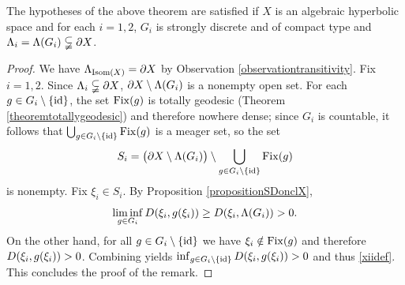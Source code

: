 \begin{remark}
\label{remarkschottkyproduct}
The hypotheses of the above theorem are satisfied if $X$ is an algebraic hyperbolic space and for each $i = 1,2$, $G_i$ is strongly discrete and of compact type and $\Lambda_i = \Lambda(G_i) \subsetneqq\partial X$.
\end{remark}
\begin{proof}
We have $\Lambda_{\operatorname{Isom}(X)} = \partial X$ by Observation \ref{observationtransitivity}. Fix $i = 1,2$. Since $\Lambda_i \subsetneqq\partial X$, $\partial X\setminus\Lambda(G_i)$ is a nonempty open set. For each $g\in G_i\setminus\{\mathrm{id}\}$, the set $\operatorname{Fix}(g)$ is totally geodesic (Theorem \ref{theoremtotallygeodesic}) and therefore nowhere dense; since $G_i$ is countable, it follows that $\bigcup_{g\in G_i\setminus\{\mathrm{id}\}} \operatorname{Fix}(g)$ is a meager set, so the set
\[
S_i = \big(\partial X\setminus\Lambda(G_i)\big)\setminus\bigcup_{g\in G_i\setminus\{\mathrm{id}\}} \operatorname{Fix}(g)
\]
is nonempty. Fix $\xi_i\in S_i$. By Proposition \ref{propositionSDonclX}, 
\[
\liminf_{g\in G_i} D(\xi_i,g(\xi_i)) \geq D(\xi_i,\Lambda(G_i)) > 0. 
\]
On the other hand, for all $g\in G_i\setminus\{\mathrm{id}\}$ we have $\xi_i \notin \operatorname{Fix}(g)$ and therefore $D(\xi_i,g(\xi_i)) > 0$. Combining yields $\inf_{g\in G_i\setminus\{\mathrm{id}\}} D(\xi_i,g(\xi_i)) > 0$ and thus \eqref{xiidef}. This concludes the proof of the remark.
\end{proof}



